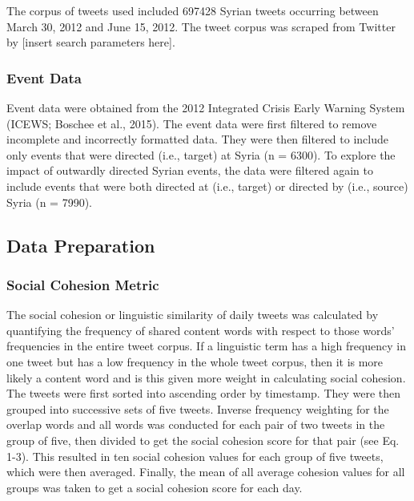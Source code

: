 \documentclass[english,man]{apa6}
\begin{document}
The corpus of tweets used included 697428 Syrian tweets occurring between March 30, 2012 and June 15, 2012. The tweet corpus was scraped from Twitter by {[}insert search parameters here{]}.

\hypertarget{event-data}{%
\subsubsection{Event Data}\label{event-data}}

Event data were obtained from the 2012 Integrated Crisis Early Warning System (ICEWS; Boschee et al., 2015). The event data were first filtered to remove incomplete and incorrectly formatted data. They were then filtered to include only events that were directed (i.e., target) at Syria (n = 6300). To explore the impact of outwardly directed Syrian events, the data were filtered again to include events that were both directed at (i.e., target) or directed by (i.e., source) Syria (n = 7990).

\hypertarget{data-preparation}{%
\subsection{Data Preparation}\label{data-preparation}}

\hypertarget{social-cohesion-metric}{%
\subsubsection{Social Cohesion Metric}\label{social-cohesion-metric}}

The social cohesion or linguistic similarity of daily tweets was calculated by quantifying the frequency of shared content words with respect to those words' frequencies in the entire tweet corpus. If a linguistic term has a high frequency in one tweet but has a low frequency in the whole tweet corpus, then it is more likely a content word and is this given more weight in calculating social cohesion.
The tweets were first sorted into ascending order by timestamp. They were then grouped into successive sets of five tweets. Inverse frequency weighting for the overlap words and all words was conducted for each pair of two tweets in the group of five, then divided to get the social cohesion score for that pair (see Eq. 1-3). This resulted in ten social cohesion values for each group of five tweets, which were then averaged. Finally, the mean of all average cohesion values for all groups was taken to get a social cohesion score for each day.
\end{document}
